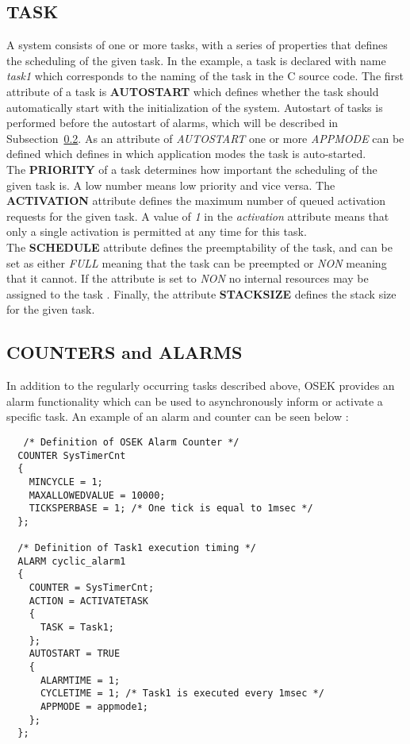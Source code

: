 \subsection{TASK}
A system consists of one or more tasks, with a series of properties that defines the scheduling of the given task.
In the example, a task is declared with name \textit{task1} which corresponds to the naming of the task in the C source code.
The first attribute of a task is \textbf{AUTOSTART} which defines whether the task should automatically start with the initialization of the system.
Autostart of tasks is performed before the autostart of alarms, which will be described in Subsection~\ref{Subsec:OIL:ALARMS}\cite{irisa223}.
As an attribute of \textit{AUTOSTART} one or more \textit{APPMODE} can be defined which defines in which application modes the task is auto-started.\\
The \textbf{PRIORITY} of a task determines how important the scheduling of the given task is.
A low number means low priority and vice versa. 
The \textbf{ACTIVATION} attribute defines the maximum number of queued activation requests for the given task.
A value of \textit{1} in the \textit{activation} attribute means that only a single activation is permitted at any time for this task.\\
The \textbf{SCHEDULE} attribute defines the preemptability of the task, and can be set as either \textit{FULL} meaning that the task can be preempted or \textit{NON} meaning that it cannot.
If the attribute is set to \textit{NON} no internal resources may be assigned to the task \cite{irisa25}.
Finally, the attribute \textbf{STACKSIZE} defines the stack size for the given task.

\subsection{COUNTERS and ALARMS}\label{Subsec:OIL:ALARMS}
In addition to the regularly occurring tasks described above, OSEK provides an alarm functionality which can be used to asynchronously inform or activate a specific task.
An example of an alarm and counter can be seen below \cite{rms}:
\begin{lstlisting}
   /* Definition of OSEK Alarm Counter */
  COUNTER SysTimerCnt
  {
    MINCYCLE = 1;
    MAXALLOWEDVALUE = 10000;
    TICKSPERBASE = 1; /* One tick is equal to 1msec */
  };

  /* Definition of Task1 execution timing */
  ALARM cyclic_alarm1
  {
    COUNTER = SysTimerCnt;
    ACTION = ACTIVATETASK
    {
      TASK = Task1;
    };
    AUTOSTART = TRUE
    {
      ALARMTIME = 1;
      CYCLETIME = 1; /* Task1 is executed every 1msec */
      APPMODE = appmode1;
    };
  };
\end{lstlisting}

